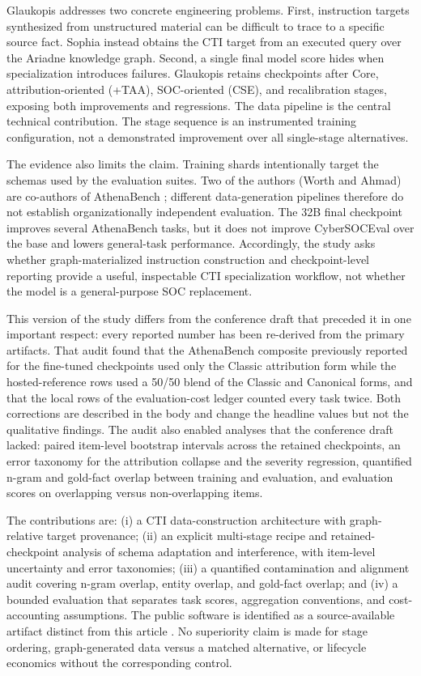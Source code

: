 \documentclass[preprint,12pt,authoryear]{elsarticle}
\begin{document}
Glaukopis addresses two concrete engineering problems. First, instruction targets synthesized from unstructured material can be difficult to trace to a specific source fact. Sophia instead obtains the CTI target from an executed query over the Ariadne knowledge graph. Second, a single final model score hides when specialization introduces failures. Glaukopis retains checkpoints after Core, attribution-oriented (+TAA), SOC-oriented (CSE), and recalibration stages, exposing both improvements and regressions. The data pipeline is the central technical contribution. The stage sequence is an instrumented training configuration, not a demonstrated improvement over all single-stage alternatives.

The evidence also limits the claim. Training shards intentionally target the schemas used by the evaluation suites. Two of the authors (Worth and Ahmad) are co-authors of AthenaBench \citep{alam2025athenabench}; different data-generation pipelines therefore do not establish organizationally independent evaluation. The 32B final checkpoint improves several AthenaBench tasks, but it does not improve CyberSOCEval over the base and lowers general-task performance. Accordingly, the study asks whether graph-materialized instruction construction and checkpoint-level reporting provide a useful, inspectable CTI specialization workflow, not whether the model is a general-purpose SOC replacement.

This version of the study differs from the conference draft that preceded it in one important respect: every reported number has been re-derived from the primary artifacts. That audit found that the AthenaBench composite previously reported for the fine-tuned checkpoints used only the Classic attribution form while the hosted-reference rows used a 50/50 blend of the Classic and Canonical forms, and that the local rows of the evaluation-cost ledger counted every task twice. Both corrections are described in the body and change the headline values but not the qualitative findings. The audit also enabled analyses that the conference draft lacked: paired item-level bootstrap intervals across the retained checkpoints, an error taxonomy for the attribution collapse and the severity regression, quantified n-gram and gold-fact overlap between training and evaluation, and evaluation scores on overlapping versus non-overlapping items.

The contributions are: (i) a CTI data-construction architecture with graph-relative target provenance; (ii) an explicit multi-stage recipe and retained-checkpoint analysis of schema adaptation and interference, with item-level uncertainty and error taxonomies; (iii) a quantified contamination and alignment audit covering n-gram overlap, entity overlap, and gold-fact overlap; and (iv) a bounded evaluation that separates task scores, aggregation conventions, and cost-accounting assumptions. The public software is identified as a source-available artifact distinct from this article \citep{glaukopis2026software}. No superiority claim is made for stage ordering, graph-generated data versus a matched alternative, or lifecycle economics without the corresponding control.
\end{document}
